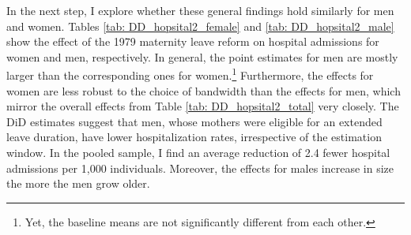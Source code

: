\documentclass[11pt, a4paper,draft]{article} %
\newcommand\natalia[1]{\textcolor{orange}{#1}}
\begin{document}






 
In the next step, I explore whether these general findings hold similarly for men and women. Tables \ref{tab: DD_hopsital2_female} and \ref{tab: DD_hopsital2_male} show the effect of the 1979 maternity leave reform on hospital admissions for women and men, respectively. In general, the point estimates for men are mostly larger than the corresponding ones for women.\footnote{Yet, the baseline means are not significantly different from each other.} Furthermore, the effects for women are less robust to the choice of bandwidth than the effects for men, which mirror the overall effects from Table \ref{tab: DD_hopsital2_total} very closely. The DiD estimates suggest that men, whose mothers were eligible for an extended leave duration, have lower hospitalization rates, irrespective of the estimation window. In the pooled sample, I find an average reduction of 2.4 fewer hospital admissions per 1,000 individuals. Moreover, the effects for males increase in size the more the men grow older. 
\end{document}
